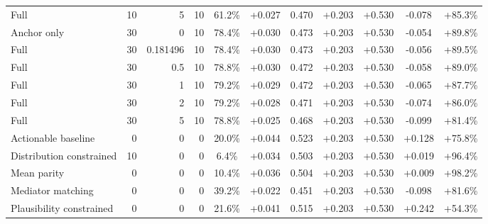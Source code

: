 \begin{table}[htbp]
\begin{tabular}{lrrrccccccc}
Full & 10 & 5 & 10 & 61.2\% & +0.027 & 0.470 & +0.203 & +0.530 & -0.078 & +85.3\% \\
Anchor only & 30 & 0 & 10 & 78.4\% & +0.030 & 0.473 & +0.203 & +0.530 & -0.054 & +89.8\% \\
Full & 30 & 0.181496 & 10 & 78.4\% & +0.030 & 0.473 & +0.203 & +0.530 & -0.056 & +89.5\% \\
Full & 30 & 0.5 & 10 & 78.8\% & +0.030 & 0.472 & +0.203 & +0.530 & -0.058 & +89.0\% \\
Full & 30 & 1 & 10 & 79.2\% & +0.029 & 0.472 & +0.203 & +0.530 & -0.065 & +87.7\% \\
Full & 30 & 2 & 10 & 79.2\% & +0.028 & 0.471 & +0.203 & +0.530 & -0.074 & +86.0\% \\
Full & 30 & 5 & 10 & 78.8\% & +0.025 & 0.468 & +0.203 & +0.530 & -0.099 & +81.4\% \\
Actionable baseline & 0 & 0 & 0 & 20.0\% & +0.044 & 0.523 & +0.203 & +0.530 & +0.128 & +75.8\% \\
Distribution constrained & 10 & 0 & 0 & 6.4\% & +0.034 & 0.503 & +0.203 & +0.530 & +0.019 & +96.4\% \\
Mean parity & 0 & 0 & 0 & 10.4\% & +0.036 & 0.504 & +0.203 & +0.530 & +0.009 & +98.2\% \\
Mediator matching & 0 & 0 & 0 & 39.2\% & +0.022 & 0.451 & +0.203 & +0.530 & -0.098 & +81.6\% \\
Plausibility constrained & 0 & 0 & 0 & 21.6\% & +0.041 & 0.515 & +0.203 & +0.530 & +0.242 & +54.3\% \\
\bottomrule
\end{tabular}
\end{table}
